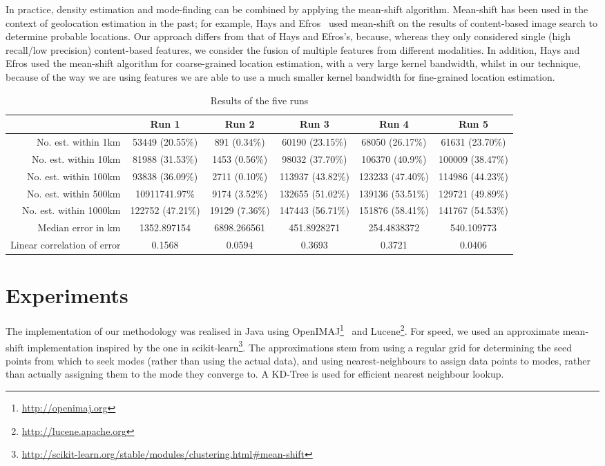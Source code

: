\documentclass{../acm_proc_article-me11_tweaked}
\begin{document}
In practice, density estimation and mode-finding can be combined by applying the mean-shift algorithm. Mean-shift has been used in the context of geolocation estimation in the past; for example, Hays and Efros~\cite{Hays:2008:im2gps} used mean-shift on the results of content-based image search to determine probable locations. Our approach differs from that of Hays and Efros's, because, whereas they only considered single (high recall/low precision) content-based features, we consider the fusion of multiple features from different modalities. In addition, Hays and Efros used the mean-shift algorithm for coarse-grained location estimation, with a very large kernel bandwidth, whilst in our technique, because of the way we are using features we are able to use a much smaller kernel bandwidth for fine-grained location estimation.

\begin{table*}[ht!]
	\centering
	\caption{\label{tab:results}Results of the five runs}
	\begin{tabular}{|r||c|c|c|c|c|}
		\hline
		 & Run 1 & Run 2 & Run 3 & Run 4 & Run 5 \\ \hline \hline
		No. est. within 1km & 53449 (20.55\%) & 891 (0.34\%) & 60190 (23.15\%) & 68050 (26.17\%) & 61631 (23.70\%) \\ \hline
		No. est. within 10km & 81988 (31.53\%) & 1453 (0.56\%) & 98032 (37.70\%) & 106370 (40.9\%) & 100009 (38.47\%) \\ \hline
		No. est. within 100km & 93838 (36.09\%) & 2711 (0.10\%) & 113937 (43.82\%) & 123233 (47.40\%) & 114986 (44.23\%) \\ \hline
		No. est. within 500km & 10911741.97\% & 9174 (3.52\%) & 132655 (51.02\%) & 139136 (53.51\%) & 129721 (49.89\%) \\ \hline
		No. est. within 1000km & 122752 (47.21\%) & 19129 (7.36\%) & 147443 (56.71\%) & 151876 (58.41\%) & 141767 (54.53\%) \\ \hline
		Median error in km & 1352.897154 & 6898.266561 & 451.8928271 & 254.4838372 & 540.109773 \\ \hline
		Linear correlation of error & 0.1568 & 0.0594 & 0.3693 & 0.3721 & 0.0406 \\ \hline
	\end{tabular}
\end{table*}

\section{Experiments}
The implementation of our methodology was realised in Java using OpenIMAJ\footnote{\url{http://openimaj.org}}~\cite{Hare:2011:OIJ:2072298.2072421} and Lucene\footnote{\url{http://lucene.apache.org}}. For speed, we used an approximate mean-shift implementation inspired by the one in scikit-learn\footnote{\url{http://scikit-learn.org/stable/modules/clustering.html#mean-shift}}. The approximations stem from using a regular grid for determining the seed points from which to seek modes (rather than using the actual data), and using nearest-neighbours to assign data points to modes, rather than actually assigning them to the mode they converge to. A KD-Tree is used for efficient nearest neighbour lookup.
\end{document}
